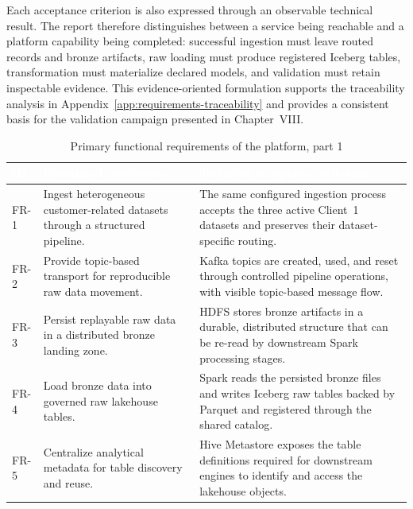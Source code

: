 \pagebreak
Each acceptance criterion is also expressed through an observable technical result. The report therefore distinguishes between a service being reachable and a platform capability being completed: successful ingestion must leave routed records and bronze artifacts, raw loading must produce registered Iceberg tables, transformation must materialize declared models, and validation must retain inspectable evidence. This evidence-oriented formulation supports the traceability analysis in Appendix~\ref{app:requirements-traceability} and provides a consistent basis for the validation campaign presented in Chapter~VIII.

\begin{table}[!htbp]
    \centering
    \footnotesize
    \renewcommand{\arraystretch}{1.16}
    \begin{tabularx}{\textwidth}{|L{1.3cm}|Y|Y|}
        \hline
        \textcolor{white}{\textbf{ID}} & \textcolor{white}{\textbf{Functional requirement}} & \textcolor{white}{\textbf{Technical acceptance criterion}} \\
        \hline
        FR-1 & Ingest heterogeneous customer-related datasets through a structured pipeline. & The same configured ingestion process accepts the three active Client~1 datasets and preserves their dataset-specific routing. \\
        \hline
        FR-2 & Provide topic-based transport for reproducible raw data movement. & Kafka topics are created, used, and reset through controlled pipeline operations, with visible topic-based message flow. \\
        \hline
        FR-3 & Persist replayable raw data in a distributed bronze landing zone. & HDFS stores bronze artifacts in a durable, distributed structure that can be re-read by downstream Spark processing stages. \\
        \hline
        FR-4 & Load bronze data into governed raw lakehouse tables. & Spark reads the persisted bronze files and writes Iceberg raw tables backed by Parquet and registered through the shared catalog. \\
        \hline
        FR-5 & Centralize analytical metadata for table discovery and reuse. & Hive Metastore exposes the table definitions required for downstream engines to identify and access the lakehouse objects. \\
        \hline
    \end{tabularx}
    \caption{Primary functional requirements of the platform, part 1}
    \label{tab:chapter4-functional-part1}
\end{table}

